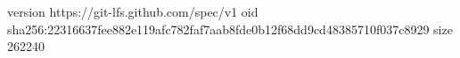 version https://git-lfs.github.com/spec/v1
oid sha256:22316637fee882e119afc782faf7aab8fde0b12f68dd9cd48385710f037c8929
size 262240
